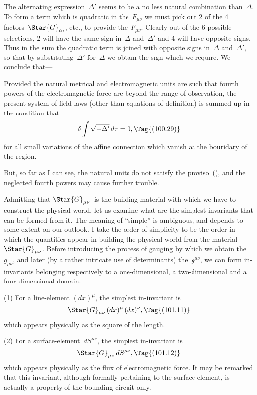\documentclass[12pt]{book}
\begin{document}
The alternating expression~$\Delta'$ seems to be a no less natural combination than~$\Delta$.
To form a term which is quadratic in the~$F_{\mu\nu}$ we must pick out 2 of the 4
factors~$\Star{G}_{\alpha\epsilon}$, etc., to provide the~$F_{\mu\nu}$.
Clearly out of the 6 possible selections, 2 will have the same sign in~$\Delta$ and~$\Delta'$ and 4 will have
opposite signs.
Thus in the sum the quadratic term is joined with opposite signs in~$\Delta$ and~$\Delta'$, so that by
substituting~$\Delta'$ for~$\Delta$ we obtain the sign which we require.
We conclude that---

Provided the natural metrical and electromagnetic units are such that fourth powers of the electromagnetic force
are beyond the range of observation, the present system of field-laws (other than equations of definition) is
summed up in the condition that
\[
\delta \int \sqrt{-\Delta'}\,d\tau = 0,
\Tag{(100.29)}
\]
for all small variations of the affine connection which vanish at the bouridary of the region.

But, so far as I can see, the natural units do not satisfy the proviso~(), and the neglected fourth
powers may cause further trouble.

%
%

Admitting that $\Star{G}_{\mu\nu}$~is the building\hyp{}material with which we have to construct
the physical world, let us examine what are the simplest invariants
that can be formed from it. The meaning of ``simple'' is ambiguous, and
depends to some extent on our outlook. I take the order of simplicity to be
the order in which the quantities appear in building the physical world from
the material~$\Star{G}_{\mu\nu}$. Before introducing the process of gauging by which we
obtain the~$g_{\mu\nu}$, and later (by a rather intricate use of determinants) the~$g^{\mu\nu}$,
we can form in\hyp{}invariants belonging respectively to a one\hyp{}dimensional, a two\hyp{}dimensional
%
and a four\hyp{}dimensional domain.

(1) For a line\hyp{}element $(dx)^{\mu}$, the simplest in\hyp{}invariant is
\[
\Star{G}_{\mu\nu}\, (dx)^{\mu}\, (dx)^{\nu},
\Tag{(101.11)}
\]
which appears physically as the square of the length.

(2) For a surface\hyp{}element~$dS^{\mu\nu}$, the simplest in\hyp{}invariant is
%
\[
\Star{G}_{\mu\nu}\, dS^{\mu\nu},
\Tag{(101.12)}
\]
which appears physically as the flux of electromagnetic force. It may be
%
remarked that this invariant, although formally pertaining to the surface\hyp{}element,
is actually a property of the bounding circuit only.
\end{document}

